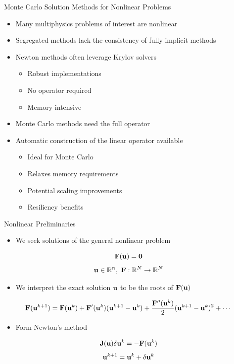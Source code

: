 \documentclass{beamer}
\begin{document}
\begin{frame}{Monte Carlo Solution Methods for Nonlinear Problems}

  \begin{itemize}
  \item Many multiphysics problems of interest are nonlinear
    \medskip
  \item Segregated methods lack the consistency of fully implicit
    methods
    \medskip
  \item Newton methods often leverage Krylov solvers
    \begin{itemize}
    \item Robust implementations
    \item No operator required
    \item Memory intensive
    \end{itemize}
    \medskip
  \item Monte Carlo methods need the full operator
    \medskip
  \item Automatic construction of the linear operator available
    \begin{itemize}
    \item Ideal for Monte Carlo
    \item Relaxes memory requirements
    \item Potential scaling improvements
    \item Resiliency benefits
    \end{itemize}
  \end{itemize}

\end{frame}

\begin{frame}{Nonlinear Preliminaries}

  \begin{itemize}
  \item We seek solutions of the general nonlinear problem
  \end{itemize}

  \[
  \mathbf{F}(\mathbf{u}) = \mathbf{0}
  \]
  \[
  \mathbf{u} \in \mathbb{R}^n,\ \mathbf{F}:\mathbb{R}^N \rightarrow
  \mathbb{R}^N
  \]

  \begin{itemize}
  \item We interpret the exact solution $\mathbf{u}$ to be the roots of
    $\mathbf{F}(\mathbf{u})$
  \end{itemize}

  \[
  \mathbf{F}(\mathbf{u}^{k+1}) = \mathbf{F}(\mathbf{u}^{k}) +
  \mathbf{F}'(\mathbf{u}^{k})(\mathbf{u}^{k+1}-\mathbf{u}^{k}) +
  \frac{\mathbf{F}''(\mathbf{u}^{k})}{2}(\mathbf{u}^{k+1}-\mathbf{u}^{k})^2 + \cdots
  \]

  \begin{itemize}
  \item Form Newton's method
  \end{itemize}
  \[
  \mathbf{J}(\mathbf{u}) \delta \mathbf{u}^k = -\mathbf{F}(\mathbf{u}^{k})
  \]
  \[
  \mathbf{u}^{k+1} = \mathbf{u}^k + \delta \mathbf{u}^k
  \]

\end{frame}
\end{document}
